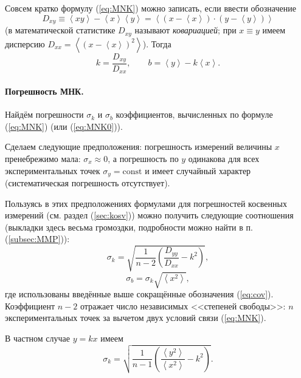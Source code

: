 \documentclass[10pt]{article}
\begin{document}
{\footnotesize{}Совсем кратко формулу (\ref{eq:MNK}) можно записать,
если ввести обозначение
\begin{equation}
D_{xy}\equiv\left\langle xy\right\rangle -\left\langle x\right\rangle \left\langle y\right\rangle =\left\langle \left(x-\left\langle x\right\rangle \right)\cdot\left(y-\left\langle y\right\rangle \right)\right\rangle \label{eq:cov}
\end{equation}
(в математической статистике $D_{xy}$ называют }\emph{\footnotesize{}ковариацией}{\footnotesize{};
при $x\equiv y$ имеем дисперсию $D_{xx}=\left\langle \left(x-\left\langle x\right\rangle \right)^{2}\right\rangle $).
Тогда
\begin{equation}
k=\frac{D_{xy}}{D_{xx}},\qquad b=\left\langle y\right\rangle -k\left\langle x\right\rangle .\label{eq:MNK_short}
\end{equation}
}{\footnotesize\par}

\paragraph{Погрешность МНК.}

Найдём погрешности $\sigma_{k}$ и $\sigma_{b}$ коэффициентов, вычисленных
по формуле (\ref{eq:MNK}) (или (\ref{eq:MNK0})).

Сделаем следующие предположения: погрешность измерений величины $x$
пренебрежимо мала: $\sigma_{x}\approx0$, а погрешность по $y$ одинакова
для всех экспериментальных точек $\sigma_{y}=\mathrm{const}$ и имеет
случайный характер (систематическая погрешность отсутствует).

Пользуясь в этих предположениях формулами для погрешностей косвенных
измерений (см. раздел (\ref{sec:kosv})) можно получить следующие
соотношения (выкладки здесь весьма громоздки, подробности можно найти
в п. (\ref{subsec:MMP})):
\begin{equation}
\sigma_{k}=\sqrt{\frac{1}{n-2}\left(\frac{D_{yy}}{D_{xx}}-k^{2}\right)},\label{eq:MNK_sigma}
\end{equation}
\begin{equation}
\sigma_{b}=\sigma_{k}\sqrt{\left\langle x^{2}\right\rangle },\label{eq:MNK_sigma_b}
\end{equation}
где использованы введённые выше сокращённые обозначения (\ref{eq:cov}).
Коэффициент $n-2$ отражает число независимых <<степеней
свободы>>: $n$ экспериментальных точек за вычетом двух
условий связи (\ref{eq:MNK}).

В частном случае $y=kx$ имеем
\begin{equation}
\sigma_{k}=\sqrt{\frac{1}{n-1}\left(\frac{\left\langle y^{2}\right\rangle }{\left\langle x^{2}\right\rangle }-k^{2}\right)}.\label{eq:MNK_sigma0}
\end{equation}
\end{document}
